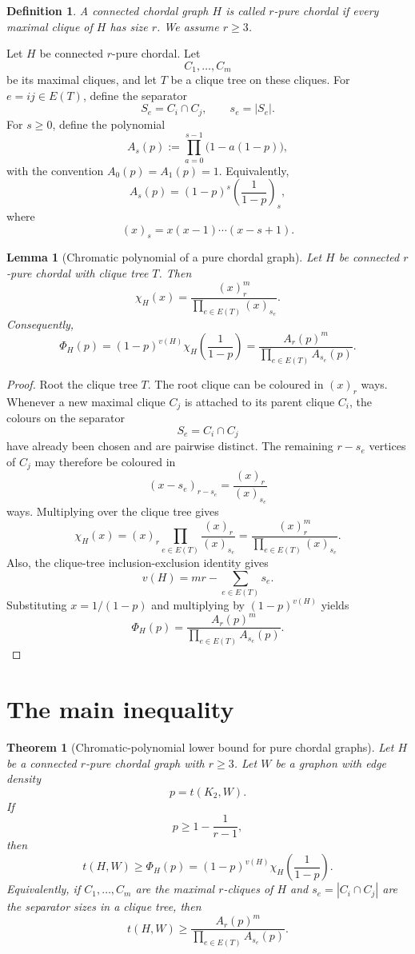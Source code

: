 \documentclass[11pt]{article}
\newtheorem{theorem}{Theorem}
\newtheorem{lemma}{Lemma}
\newtheorem{definition}{Definition}
\newcommand{\K}{K}
\begin{document}
\begin{definition}
A connected chordal graph \(H\) is called \emph{\(r\)-pure chordal} if every
maximal clique of \(H\) has size \(r\). We assume \(r\ge 3\).
\end{definition}

Let \(H\) be connected \(r\)-pure chordal. Let
\[
C_1,\dots,C_m
\]
be its maximal cliques, and let \(T\) be a clique tree on these cliques. For
\(e=ij\in E(T)\), define the separator
\[
S_e=C_i\cap C_j,
\qquad
s_e=|S_e|.
\]
For \(s\ge 0\), define the polynomial
\[
A_s(p)
:=
\prod_{a=0}^{s-1}\bigl(1-a(1-p)\bigr),
\]
with the convention \(A_0(p)=A_1(p)=1\). Equivalently,
\[
A_s(p)
=
(1-p)^s\left(\frac1{1-p}\right)_s,
\]
where
\[
(x)_s=x(x-1)\cdots(x-s+1).
\]

\begin{lemma}[Chromatic polynomial of a pure chordal graph]
Let \(H\) be connected \(r\)-pure chordal with clique tree \(T\). Then
\[
\chi_H(x)
=
\frac{(x)_r^m}{\prod_{e\in E(T)}(x)_{s_e}}.
\]
Consequently,
\[
\Phi_H(p)
=
(1-p)^{v(H)}
\chi_H\!\left(\frac1{1-p}\right)
=
\frac{A_r(p)^m}{\prod_{e\in E(T)}A_{s_e}(p)}.
\]
\end{lemma}

\begin{proof}
Root the clique tree \(T\). The root clique can be coloured in \((x)_r\) ways.
Whenever a new maximal clique \(C_j\) is attached to its parent clique \(C_i\),
the colours on the separator
\[
S_e=C_i\cap C_j
\]
have already been chosen and are pairwise distinct. The remaining
\(r-s_e\) vertices of \(C_j\) may therefore be coloured in
\[
(x-s_e)_{r-s_e}
=
\frac{(x)_r}{(x)_{s_e}}
\]
ways. Multiplying over the clique tree gives
\[
\chi_H(x)
=
(x)_r
\prod_{e\in E(T)}
\frac{(x)_r}{(x)_{s_e}}
=
\frac{(x)_r^m}{\prod_{e\in E(T)}(x)_{s_e}}.
\]
Also, the clique-tree inclusion-exclusion identity gives
\[
v(H)=mr-\sum_{e\in E(T)}s_e.
\]
Substituting \(x=1/(1-p)\) and multiplying by \((1-p)^{v(H)}\) yields
\[
\Phi_H(p)
=
\frac{A_r(p)^m}{\prod_{e\in E(T)}A_{s_e}(p)}.
\]
\end{proof}

\section{The main inequality}

\begin{theorem}[Chromatic-polynomial lower bound for pure chordal graphs]
Let \(H\) be a connected \(r\)-pure chordal graph with \(r\ge 3\). Let \(W\) be
a graphon with edge density
\[
p=t(\K_2,W).
\]
If
\[
p\ge 1-\frac1{r-1},
\]
then
\[
\boxed{
t(H,W)
\ge
\Phi_H(p)
=
(1-p)^{v(H)}
\chi_H\!\left(\frac1{1-p}\right).
}
\]
Equivalently, if \(C_1,\dots,C_m\) are the maximal \(r\)-cliques of \(H\) and
\(s_e=|C_i\cap C_j|\) are the separator sizes in a clique tree, then
\[
t(H,W)
\ge
\frac{A_r(p)^m}{\prod_{e\in E(T)}A_{s_e}(p)}.
\]
\end{theorem}
\end{document}
